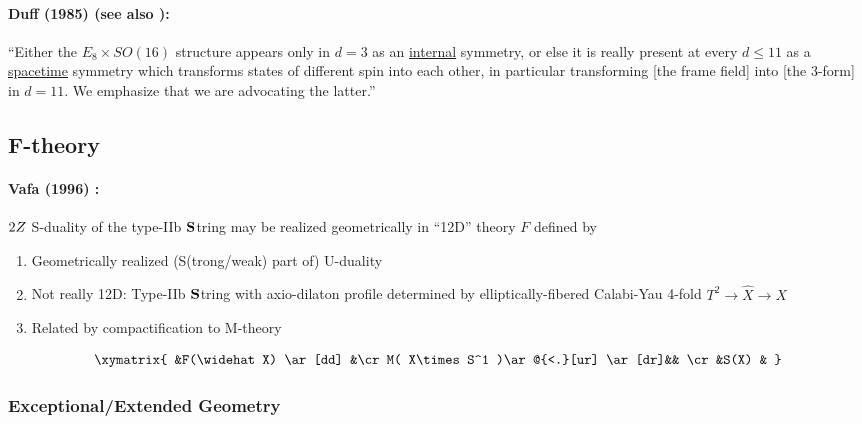 \documentclass[12pt]{article} %
\numberwithin{equation}{section}
\begin{document}
\paragraph{
	Duff (1985) \cite{Duff:1985bv} (see also \cite{Duff:1986ne,Duff:1989tf}): 
}
``Either the $E_8\times SO(16)$ structure appears only in $d=3$ as an \underline{internal} symmetry, or else it is really present at every $d\leq 11$ as a \underline{spacetime} symmetry which transforms states of different spin into each other, in particular transforming [the frame field] into [the 3-form] in $d=11$. We emphasize that we are advocating the latter.'' 


\subsection{F-theory}
\paragraph{
	Vafa (1996) \cite{Vafa:1996xn}: 
}	
$\sl2Z$ S-duality of the type-II{\sc b} $\bf S$tring may be realized geometrically in ``12D'' theory $F$ defined by
\begin{enumerate}
\item Geometrically realized (S(trong/weak) part of) U-duality
\item Not really 12D: Type-II{\sc b} $\bf S$tring with axio-dilaton profile determined by elliptically-fibered Calabi-Yau 4-fold $T^2 \rightarrow \widehat X\rightarrow X$
\item Related by compactification to M-theory
\end{enumerate}
\begin{align*}
\xymatrix{
	&F(\widehat X) \ar[dd] &\cr
	M( X\times S^1 )\ar@{<.}[ur] \ar[dr]&& \cr %
	&S(X) &
	}
\end{align*}



\subsubsection{Exceptional/Extended Geometry}
\end{document}
